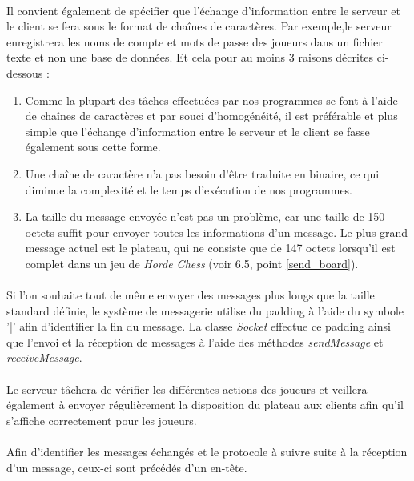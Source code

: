\documentclass[10pt, a4paper]{article}
\begin{document}
\paragraph{}Il convient également de spécifier que l'échange d'information entre le serveur et le client se fera sous le format de chaînes de caractères. Par exemple,le serveur enregistrera les noms de compte et mots de passe des joueurs dans un fichier texte et non une base de données. Et cela pour au moins 3 raisons décrites ci-dessous :
\begin{enumerate}
\item Comme la plupart des tâches effectuées par nos programmes se font à l'aide de chaînes de caractères et par souci d'homogénéité, il est préférable et plus simple que l'échange d'information entre le serveur et le client se fasse également sous cette forme.
\item Une chaîne de caractère n'a pas besoin d'être traduite en binaire, ce qui diminue la complexité et le temps d'exécution de nos programmes.
\item La taille du message envoyée n'est pas un problème, car une taille de 150 octets suffit pour envoyer toutes les informations d'un message. Le plus grand message actuel est le plateau, qui ne consiste que de 147 octets lorsqu'il est complet dans un jeu de \textit{Horde Chess} (voir 6.5, point \ref{send_board}).
\end{enumerate}
\paragraph{}Si l'on souhaite tout de même envoyer des messages plus longs que la taille standard définie, le système de messagerie utilise du padding à l'aide du symbole '|' afin d'identifier la fin du message. La classe \textit{Socket} effectue ce padding ainsi que l'envoi et la réception de messages à l'aide des méthodes \textit{sendMessage} et \textit{receiveMessage}.
\paragraph{}Le serveur tâchera de vérifier les différentes actions des joueurs et veillera également à envoyer régulièrement la disposition du plateau aux clients afin qu'il s'affiche correctement pour les joueurs.
\paragraph{}Afin d'identifier les messages échangés et le protocole à suivre suite à la réception d'un message, ceux-ci sont précédés d'un en-tête.
\end{document}
